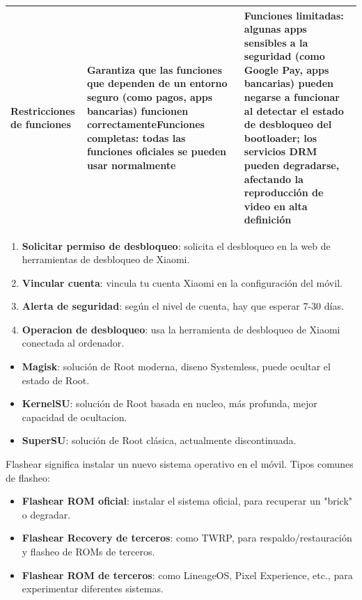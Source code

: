 \begin{center}
\begin{tabularx}{\linewidth}{|X|X|X|}
Restricciones de funciones & Garantiza que las funciones que dependen de un entorno seguro (como pagos, apps bancarias) funcionen correctamente\newline Funciones completas: todas las funciones oficiales se pueden usar normalmente & Funciones limitadas: algunas apps sensibles a la seguridad (como Google Pay, apps bancarias) pueden negarse a funcionar al detectar el estado de desbloqueo del bootloader; los servicios DRM pueden degradarse, afectando la reproducción de video en alta definición \tabularnewline
\hline
\end{tabularx}
\end{center}


\begin{enumerate}
  \item \textbf{Solicitar permiso de desbloqueo}: solicita el desbloqueo en la web de herramientas de desbloqueo de Xiaomi.
  \item \textbf{Vincular cuenta}: vincula tu cuenta Xiaomi en la configuración del móvil.
  \item \textbf{Alerta de seguridad}: según el nivel de cuenta, hay que esperar 7-30 días.
  \item \textbf{Operacion de desbloqueo}: usa la herramienta de desbloqueo de Xiaomi conectada al ordenador.
\end{enumerate}


\begin{itemize}
  \item \textbf{Magisk}: solución de Root moderna, diseno Systemless, puede ocultar el estado de Root.
  \item \textbf{KernelSU}: solución de Root basada en nucleo, más profunda, mejor capacidad de ocultacion.
  \item \textbf{SuperSU}: solución de Root clásica, actualmente discontinuada.
\end{itemize}


Flashear significa instalar un nuevo sistema operativo en el móvil. Tipos comunes de flasheo:

\begin{itemize}
  \item \textbf{Flashear ROM oficial}: instalar el sistema oficial, para recuperar un "brick" o degradar.
  \item \textbf{Flashear Recovery de terceros}: como TWRP, para respaldo/restauración y flasheo de ROMs de terceros.
  \item \textbf{Flashear ROM de terceros}: como LineageOS, Pixel Experience, etc., para experimentar diferentes sistemas.
\end{itemize}

